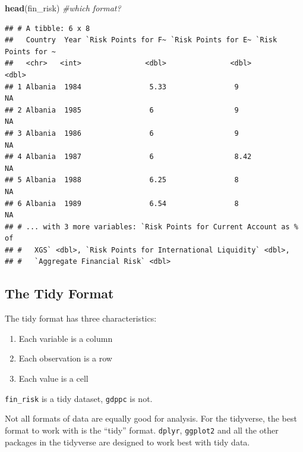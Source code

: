 \documentclass[12pt,]{article}
\newenvironment{Shaded}{\begin{snugshade}}{\end{snugshade}}
\newcommand{\KeywordTok}[1]{\textcolor[rgb]{0.13,0.29,0.53}{\textbf{#1}}}
\newcommand{\CommentTok}[1]{\textcolor[rgb]{0.56,0.35,0.01}{\textit{#1}}}
\newcommand{\NormalTok}[1]{#1}
\providecommand{\tightlist}{%
  \setlength{\itemsep}{0pt}\setlength{\parskip}{0pt}}
\begin{document}
\begin{Shaded}
\begin{Highlighting}[]
\KeywordTok{head}\NormalTok{(fin_risk) }\CommentTok{#which format?}
\end{Highlighting}
\end{Shaded}

\begin{verbatim}
## # A tibble: 6 x 8
##   Country  Year `Risk Points for F~ `Risk Points for E~ `Risk Points for ~
##   <chr>   <int>               <dbl>               <dbl>              <dbl>
## 1 Albania  1984                5.33                9                    NA
## 2 Albania  1985                6                   9                    NA
## 3 Albania  1986                6                   9                    NA
## 4 Albania  1987                6                   8.42                 NA
## 5 Albania  1988                6.25                8                    NA
## 6 Albania  1989                6.54                8                    NA
## # ... with 3 more variables: `Risk Points for Current Account as % of
## #   XGS` <dbl>, `Risk Points for International Liquidity` <dbl>,
## #   `Aggregate Financial Risk` <dbl>
\end{verbatim}

\subsection{The Tidy Format}\label{the-tidy-format}

The tidy format has three characteristics:

\begin{enumerate}
\def\labelenumi{\arabic{enumi}.}
\tightlist
\item
  Each variable is a column
\item
  Each observation is a row
\item
  Each value is a cell
\end{enumerate}

\texttt{fin\_risk} is a tidy dataset, \texttt{gdppc} is not.

Not all formats of data are equally good for analysis. For the
tidyverse, the best format to work with is the ``tidy'' format.
\texttt{dplyr}, \texttt{ggplot2} and all the other packages in the
tidyverse are designed to work best with tidy data.
\end{document}
